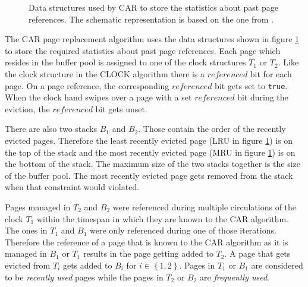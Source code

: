 \begin{@empty}
\begin{figure}[ht!]
{
		}
		\caption{Data structures used by CAR to store the statistics about past page references. The schematic representation is based on the one from \cite{Bansal:2004}.}
		\label{fig:datastructures}
	\end{figure}
\end{@empty}

	The CAR page replacement algorithm uses the data structures shown in figure \ref{fig:datastructures} to store the required statistics about past page references. Each page which resides in the buffer pool is assigned to one of the clock structures $T_1$ or $T_2$. Like the clock structure in the CLOCK algorithm there is a $referenced$ bit for each page. On a page reference, the corresponding $referenced$ bit gets set to \lstinline{true}. When the clock hand swipes over a page with a set $referenced$ bit during the eviction, the $referenced$ bit gets unset.
	
	There are also two stacks $B_1$ and $B_2$. Those contain the order of the recently evicted pages. Therefore the least recently evicted page (LRU in figure \ref{fig:datastructures}) is on the top of the stack and the most recently evicted page (MRU in figure \ref{fig:datastructures}) is on the bottom of the stack. The maximum size of the two stacks together is the size of the buffer pool. The most recently evicted page gets removed from the stack when that constraint would violated.
	
	Pages managed in $T_2$ and $B_2$ were referenced during multiple circulations of the clock $T_1$ within the timespan in which they are known to the CAR algorithm. The ones in $T_1$ and $B_1$ were only referenced during one of those iterations. Therefore the reference of a page that is known to the CAR algorithm as it is managed in $B_1$ or $T_1$ results in the page getting added to $T_2$. A page that gets evicted from $T_i$ gets added to $B_i$ for $i \in \left\{1, 2\right\}$. Pages in $T_1$ or $B_1$ are considered to be \emph{recently used} pages while the pages in $T_2$ or $B_2$ are \emph{frequently used}.
	
